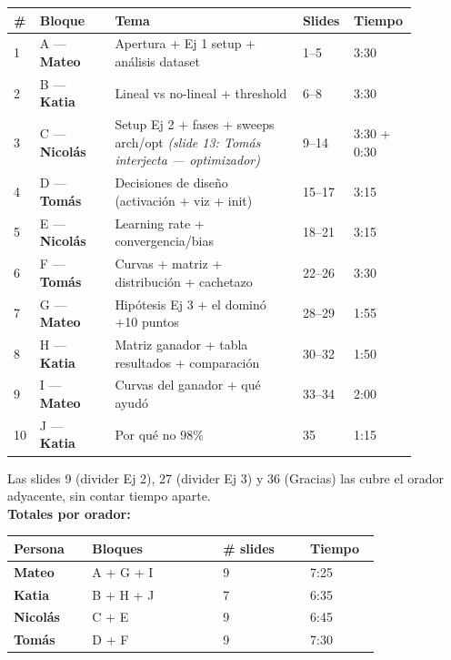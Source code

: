 \documentclass[11pt,a4paper]{article}
\begin{document}
\begin{titlepage}
\begin{flushleft}
\medskip
\begin{tabular}{@{}p{0.05\linewidth}p{0.18\linewidth}p{0.45\linewidth}p{0.10\linewidth}p{0.10\linewidth}@{}}
\toprule
\textbf{\#} & \textbf{Bloque} & \textbf{Tema} & \textbf{Slides} & \textbf{Tiempo} \\
\midrule
1 & A — \textcolor{mateoC}{\textbf{Mateo}}    & Apertura + Ej 1 setup + análisis dataset       & 1--5     & 3:30 \\
2 & B — \textcolor{katiaC}{\textbf{Katia}}    & Lineal vs no-lineal + threshold                & 6--8     & 3:30 \\
3 & C — \textcolor{nicoC}{\textbf{Nicolás}}   & Setup Ej 2 + fases + sweeps arch/opt \emph{(slide 13: \textcolor{tomasC}{Tomás} interjecta — optimizador)} & 9--14 & 3:30 + 0:30 \\
4 & D — \textcolor{tomasC}{\textbf{Tomás}}    & Decisiones de diseño (activación + viz + init)  & 15--17   & 3:15 \\
5 & E — \textcolor{nicoC}{\textbf{Nicolás}}   & Learning rate + convergencia/bias              & 18--21   & 3:15 \\
6 & F — \textcolor{tomasC}{\textbf{Tomás}}    & Curvas + matriz + distribución + cachetazo     & 22--26   & 3:30 \\
7 & G — \textcolor{mateoC}{\textbf{Mateo}}    & Hipótesis Ej 3 + el dominó +10 puntos         & 28--29   & 1:55 \\
8 & H — \textcolor{katiaC}{\textbf{Katia}}    & Matriz ganador + tabla resultados + comparación & 30--32   & 1:50 \\
9 & I — \textcolor{mateoC}{\textbf{Mateo}}    & Curvas del ganador + qué ayudó                & 33--34   & 2:00 \\
10 & J — \textcolor{katiaC}{\textbf{Katia}}   & Por qué no 98\%                                & 35       & 1:15 \\
\bottomrule
\end{tabular}

\medskip
Las slides 9 (divider Ej 2), 27 (divider Ej 3) y 36 (Gracias) las cubre el orador adyacente, sin contar tiempo aparte.\\[1em]

\textbf{Totales por orador:}

\medskip
\begin{tabular}{@{}p{0.18\linewidth}p{0.30\linewidth}p{0.20\linewidth}p{0.12\linewidth}@{}}
\toprule
\textbf{Persona} & \textbf{Bloques} & \textbf{\# slides} & \textbf{Tiempo} \\
\midrule
\textcolor{mateoC}{\textbf{Mateo}}    & A + G + I & 9  & 7:25 \\
\textcolor{katiaC}{\textbf{Katia}}    & B + H + J & 7  & 6:35 \\
\textcolor{nicoC}{\textbf{Nicolás}}   & C + E     & 9  & 6:45 \\
\textcolor{tomasC}{\textbf{Tomás}}    & D + F     & 9  & 7:30 \\
\bottomrule
\end{tabular}


\end{flushleft}
\end{titlepage}
\end{document}
